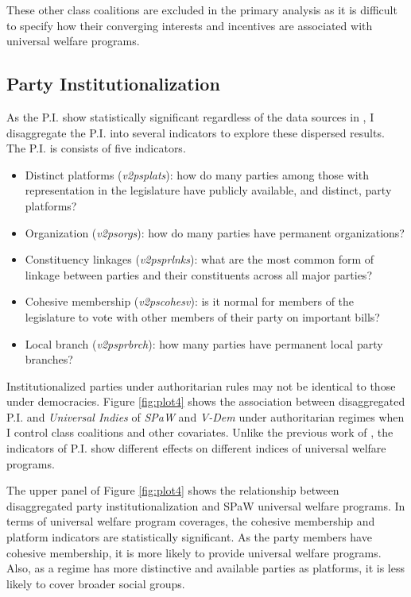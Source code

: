\documentclass[12pt]{article}
\begin{document}
	These other class coalitions are excluded in the primary analysis as it is difficult to specify how their converging interests and incentives are associated with universal welfare programs.
	
	\subsection{Party Institutionalization}
	
	As the P.I. show statistically significant regardless of the data sources in \citep{Rasmussen2019}, I disaggregate the P.I. into several indicators to explore these dispersed results. The P.I. is consists of five indicators.
	
	\begin{itemize}
		\item Distinct platforms (\textit{v2psplats}): how do many parties among those with representation in the legislature have publicly available, and distinct, party platforms?
		\item Organization (\textit{v2psorgs}): how do many parties have permanent organizations?
		\item Constituency linkages (\textit{v2psprlnks}): what are the most common form of linkage between parties and their constituents across all major parties?
		\item Cohesive membership (\textit{v2pscohesv}): is it normal for members of the legislature to vote with other members of their party on important bills?
		\item Local branch (\textit{v2psprbrch}): how many parties have permanent local party branches?
	\end{itemize}
	
	Institutionalized parties under authoritarian rules may not be identical to those under democracies. Figure \ref{fig:plot4} shows the association between disaggregated P.I. and \textit{Universal Indies} of \textit{SPaW} and \textit{V-Dem} under authoritarian regimes when I control class coalitions and other covariates. Unlike the previous work of \citet{Rasmussen2019}, the indicators of P.I. show different effects on different indices of universal welfare programs.
	
	The upper panel of Figure \ref{fig:plot4} shows the relationship between disaggregated party institutionalization and SPaW universal welfare programs. In terms of universal welfare program coverages, the cohesive membership and platform indicators are statistically significant. As the party members have cohesive membership, it is more likely to provide universal welfare programs. Also, as a regime has more distinctive and available parties as platforms, it is less likely to cover broader social groups.
	
\end{document}
